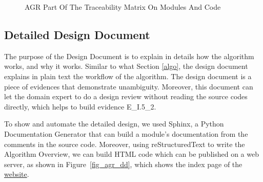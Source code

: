 \begin{figure}[H]
    \centering
    \caption[AGR Part Of The Traceability Matrix On Modules And Code]{AGR Part Of The Traceability Matrix On Modules And Code}
    \label{fig_agr_mtm_modules_code}
\end{figure}

\subsection{Detailed Design Document}
The purpose of the Design Document \cite{DD} is to explain in details how the algorithm works, and why it works. Similar to what Section \ref{algo}, the design document explains in plain text the workflow of the algorithm. The design document is a piece of evidences that demonstrate unambiguity. Moreover, this document can let the domain expert to do a design review  without reading the source codes directly,  which helps to build evidence E\_I.5\_2.

To show and automate the detailed design, we used Sphinx, a Python Documentation Generator that can build a module's documentation from the comments in the source code. Moreover, using reStructuredText to write the Algorithm Overview, we can build HTML code which can be published on a web server, as shown in Figure~\ref{fig_agr_dd}, which shows the index page of the \href{https://joviel25.github.io/AortaGR-design-document/index.html}{website}. 

